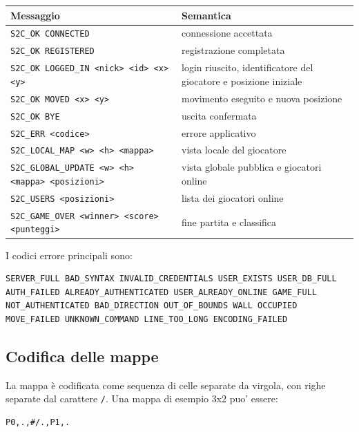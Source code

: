 \documentclass[11pt,a4paper]{article}
\begin{document}
\begin{center}
\begin{tabular}{p{} p{}}
\toprule
\textbf{Messaggio} & \textbf{Semantica} \\
\midrule
\texttt{S2C\_OK CONNECTED} & connessione accettata \\
\texttt{S2C\_OK REGISTERED} & registrazione completata \\
\texttt{S2C\_OK LOGGED\_IN <nick> <id> <x> <y>} & login riuscito, identificatore del giocatore e posizione iniziale \\
\texttt{S2C\_OK MOVED <x> <y>} & movimento eseguito e nuova posizione \\
\texttt{S2C\_OK BYE} & uscita confermata \\
\texttt{S2C\_ERR <codice>} & errore applicativo \\
\texttt{S2C\_LOCAL\_MAP <w> <h> <mappa>} & vista locale del giocatore \\
\texttt{S2C\_GLOBAL\_UPDATE <w> <h> <mappa> <posizioni>} & vista globale pubblica e giocatori online \\
\texttt{S2C\_USERS <posizioni>} & lista dei giocatori online \\
\texttt{S2C\_GAME\_OVER <winner> <score> <punteggi>} & fine partita e classifica \\
\bottomrule
\end{tabular}
\end{center}

I codici errore principali sono:

\begin{lstlisting}[style=textstyle]
SERVER_FULL BAD_SYNTAX INVALID_CREDENTIALS USER_EXISTS USER_DB_FULL
AUTH_FAILED ALREADY_AUTHENTICATED USER_ALREADY_ONLINE GAME_FULL
NOT_AUTHENTICATED BAD_DIRECTION OUT_OF_BOUNDS WALL OCCUPIED
MOVE_FAILED UNKNOWN_COMMAND LINE_TOO_LONG ENCODING_FAILED
\end{lstlisting}

\subsection{Codifica delle mappe}

La mappa è codificata come sequenza di celle separate da virgola, con righe
separate dal carattere \texttt{/}. Una mappa di esempio 3x2 puo' essere:

\begin{lstlisting}[style=textstyle]
P0,.,#/.,P1,.
\end{lstlisting}
\end{document}
